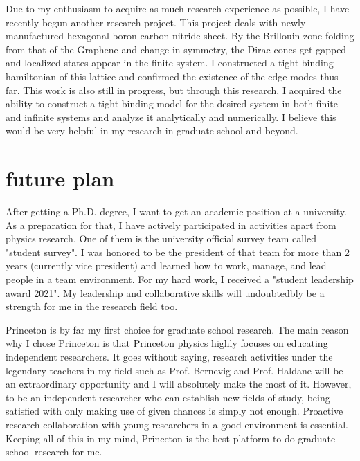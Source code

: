 \documentclass[a4]{article}
\begin{document}
Due to my enthusiasm to acquire as much research experience as possible, I have recently begun another research project. This project deals with newly manufactured hexagonal boron-carbon-nitride sheet. By the Brillouin zone folding from that of the Graphene and change in symmetry, the Dirac cones get gapped and localized states appear in the finite system. I constructed a tight binding hamiltonian of this lattice and confirmed the existence of the edge modes thus far. This work is also still in progress, but through this research, I acquired the ability to construct a tight-binding model for the desired system in both finite and infinite systems and analyze it analytically and numerically. I believe this would be very helpful in my research in graduate school and beyond.\par


\section{future plan}
After getting a Ph.D. degree, I want to get an academic position at a university. As a preparation for that, I have actively participated in activities apart from physics research. One of them is the university official survey team called "student survey". I was honored to be the president of that team for more than 2 years (currently vice president) and learned how to work, manage, and lead people in a team environment. For my hard work, I received a "student leadership award 2021". My leadership and collaborative skills will undoubtedbly be a strength for me in the research field too.\par

Princeton is by far my first choice for graduate school research. The main reason why I chose Princeton is that Princeton physics highly focuses on educating independent researchers. It goes without saying, research activities under the legendary teachers in my field such as Prof. Bernevig and Prof. Haldane will be an extraordinary opportunity and I will absolutely make the most of it. However, to be an independent researcher who can establish new fields of study, being satisfied with only making use of given chances is simply not enough. Proactive research collaboration with young researchers in a good environment is essential. Keeping all of this in my mind, Princeton is the best platform to do graduate school research for me.
\end{document}

